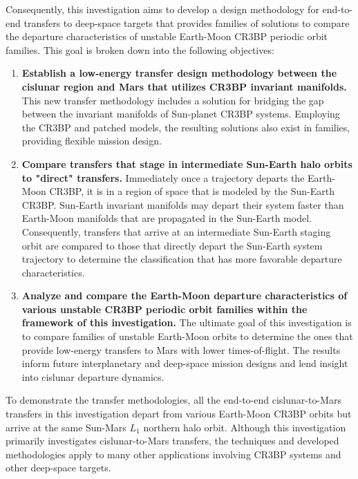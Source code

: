 Consequently, this investigation aims to develop a design methodology for end-to-end transfers to
deep-space targets that provides families of solutions to compare the departure characteristics of
unstable Earth-Moon CR3BP periodic orbit families. This goal is broken down into the following
objectives:
\begin{enumerate}
    \item   \textbf{Establish a low-energy transfer design methodology between the cislunar region
			and Mars that utilizes CR3BP invariant manifolds.} This new transfer methodology
			includes a solution for bridging the gap between the invariant manifolds of Sun-planet
			CR3BP systems. Employing the CR3BP and patched models, the resulting solutions also
			exist in families, providing flexible mission design.
    \item   \textbf{Compare transfers that stage in intermediate Sun-Earth halo orbits to "direct"
			transfers.} Immediately once a trajectory departs the Earth-Moon CR3BP, it is in a
			region of space that is modeled by the Sun-Earth CR3BP. Sun-Earth invariant manifolds
			may depart their system faster than Earth-Moon manifolds that are propagated in the
			Sun-Earth model. Consequently, transfers that arrive at an intermediate Sun-Earth
			staging orbit are compared to those that directly depart the Sun-Earth system
			trajectory to determine the classification that has more favorable departure
			characteristics.
    \item   \textbf{Analyze and compare the Earth-Moon departure characteristics of various
			unstable CR3BP periodic orbit families within the framework of this investigation.} The
			ultimate goal of this investigation is to compare families of unstable Earth-Moon
			orbits to determine the ones that provide low-energy transfers to Mars with lower
			times-of-flight. The results inform future interplanetary and deep-space mission
			designs and lend insight into cislunar departure dynamics.

\end{enumerate}
To demonstrate the transfer methodologies, all the end-to-end cislunar-to-Mars transfers in this
investigation depart from various Earth-Moon CR3BP orbits but arrive at the same Sun-Mars $L_{1}$
northern halo orbit. Although this investigation primarily investigates cislunar-to-Mars transfers,
the techniques and developed methodologies apply to many other applications involving CR3BP systems
and other deep-space targets.

